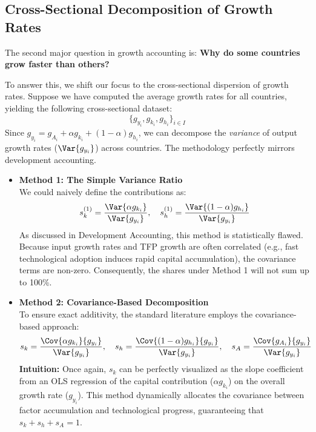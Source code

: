 {\begin{center}
\end{center}
}

\subsection{Cross-Sectional Decomposition of Growth Rates}

The second major question in growth accounting is: \textbf{Why do some countries grow faster than others?} 

To answer this, we shift our focus to the cross-sectional dispersion of growth rates. Suppose we have computed the average growth rates for all countries, yielding the following cross-sectional dataset:
\[
\{g_{y_i}, g_{k_i}, g_{h_i}\}_{i\in I}
\]
Since $g_{y_i} = g_{A_i} + \alpha g_{k_i} + (1-\alpha) g_{h_i}$, we can decompose the \textit{variance} of output growth rates ($\Var{g_{y_i}}$) across countries. The methodology perfectly mirrors development accounting.
\begin{itemize}
    \item \textbf{Method 1: The Simple Variance Ratio} \\
We could naively define the contributions as:
\[
s_k^{(1)} = \frac{\Var{\alpha g_{k_i}}}{\Var{g_{y_i}}}, \quad s_h^{(1)} = \frac{\Var{(1-\alpha) g_{h_i}}}{\Var{g_{y_i}}}
\]
As discussed in Development Accounting, this method is statistically flawed. Because input growth rates and TFP growth are often correlated (e.g., fast technological adoption induces rapid capital accumulation), the covariance terms are non-zero. Consequently, the shares under Method 1 will not sum up to 100\%.
    \item \textbf{Method 2: Covariance-Based Decomposition} \\
To ensure exact additivity, the standard literature employs the covariance-based approach:
\[
s_k = \frac{\Cov{\alpha g_{k_i}}{g_{y_i}}}{\Var{g_{y_i}}}, \quad s_h = \frac{\Cov{(1-\alpha) g_{h_i}}{g_{y_i}}}{\Var{g_{y_i}}}, \quad s_A = \frac{\Cov{g_{A_i}}{g_{y_i}}}{\Var{g_{y_i}}}
\]
\textbf{Intuition:} Once again, $s_k$ can be perfectly visualized as the slope coefficient from an OLS regression of the capital contribution ($\alpha g_{k_i}$) on the overall growth rate ($g_{y_i}$). This method dynamically allocates the covariance between factor accumulation and technological progress, guaranteeing that $s_k + s_h + s_A = 1$.
\end{itemize}

